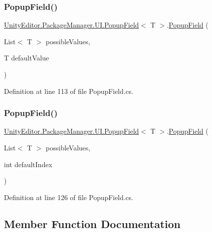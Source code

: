 \subsubsection{\texorpdfstring{PopupField()}{PopupField()}\hspace{0.1cm}{\footnotesize\ttfamily [1/2]}}
{\footnotesize\ttfamily \mbox{\hyperlink{class_unity_editor_1_1_package_manager_1_1_u_i_1_1_popup_field}{Unity\+Editor.\+Package\+Manager.\+U\+I.\+Popup\+Field}}$<$ T $>$.\mbox{\hyperlink{class_unity_editor_1_1_package_manager_1_1_u_i_1_1_popup_field}{Popup\+Field}} (\begin{DoxyParamCaption}\item[{List$<$ T $>$}]{possible\+Values,  }\item[{T}]{default\+Value }\end{DoxyParamCaption})}



Definition at line 113 of file Popup\+Field.\+cs.

\mbox{\label{class_unity_editor_1_1_package_manager_1_1_u_i_1_1_popup_field_a758cc96ab9fe6b8cb8548fd131487d97}} 
\subsubsection{\texorpdfstring{PopupField()}{PopupField()}\hspace{0.1cm}{\footnotesize\ttfamily [2/2]}}
{\footnotesize\ttfamily \mbox{\hyperlink{class_unity_editor_1_1_package_manager_1_1_u_i_1_1_popup_field}{Unity\+Editor.\+Package\+Manager.\+U\+I.\+Popup\+Field}}$<$ T $>$.\mbox{\hyperlink{class_unity_editor_1_1_package_manager_1_1_u_i_1_1_popup_field}{Popup\+Field}} (\begin{DoxyParamCaption}\item[{List$<$ T $>$}]{possible\+Values,  }\item[{int}]{default\+Index }\end{DoxyParamCaption})}



Definition at line 126 of file Popup\+Field.\+cs.



\subsection{Member Function Documentation}
\mbox{\label{class_unity_editor_1_1_package_manager_1_1_u_i_1_1_popup_field_af08eb4491690830c67b9567d7ecb14cc}} 
